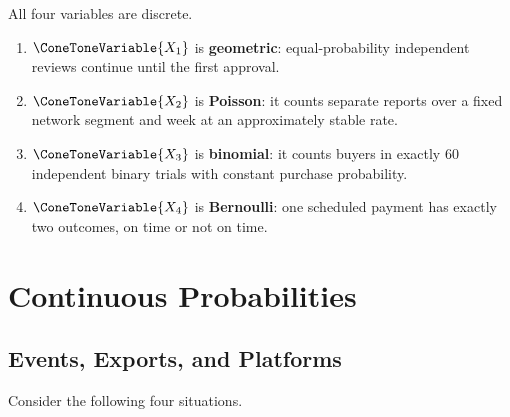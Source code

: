 	All four variables are discrete.
	\begin{enumerate}
		\item $\ConeToneVariable{X_1}$ is \textbf{geometric}: equal-probability independent reviews continue until the first approval.
		\item $\ConeToneVariable{X_2}$ is \textbf{Poisson}: it counts separate reports over a fixed network segment and week at an approximately stable rate.
		\item $\ConeToneVariable{X_3}$ is \textbf{binomial}: it counts buyers in exactly $60$ independent binary trials with constant purchase probability.
		\item $\ConeToneVariable{X_4}$ is \textbf{Bernoulli}: one scheduled payment has exactly two outcomes, on time or not on time.
	\end{enumerate}



	\section{Continuous Probabilities}
	\label{sec:continuous-probabilities}


	\subsection{Events, Exports, and Platforms}
	\label{sec:events-exports-platforms}

	Consider the following four situations.

